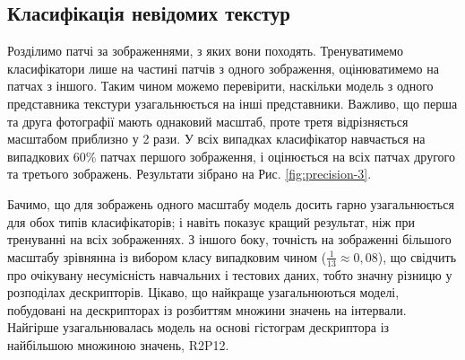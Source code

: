 \subsection{Класифікація невідомих текстур}\label{section2.1e}
Розділимо патчі за зображеннями, з яких вони походять.
Тренуватимемо класифікатори лише на частині патчів з одного зображення, оцінюватимемо на патчах з іншого.
Таким чином можемо перевірити, наскільки модель з одного представника текстури узагальнюється на інші представники.  
Важливо, що перша та друга фотографії мають однаковий масштаб, проте третя відрізняється масштабом приблизно у 2 рази.
У всіх випадках класифікатор навчається на випадкових 60\% патчах першого зображення, і оцінюється на всіх патчах другого та третього зображень.
Результати зібрано на Рис. \ref{fig:precision-3}.

Бачимо, що для зображень одного масштабу модель досить гарно узагальнюється для обох типів класифікаторів; 
і навіть показує кращий результат, ніж при тренуванні на всіх зображеннях.
З іншого боку, точність на зображенні більшого масштабу зрівнянна із вибором класу випадковим чином ($\frac{1}{13} \approx 0,08$), 
що свідчить про очікувану несумісність навчальних і тестових даних, тобто значну різницю у розподілах дескрипторів.
Цікаво, що найкраще узагальнюються моделі, побудовані на дескрипторах із розбиттям множини значень на інтервали.
Найгірше узагальнювалась модель на основі гістограм дескриптора із найбільшою множиною значень, R2P12.

